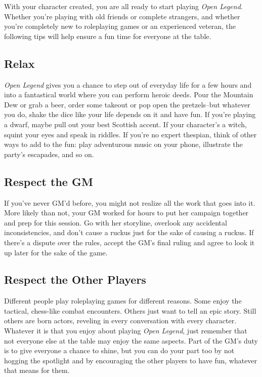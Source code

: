 \documentclass[12pt]{report}
\begin{document}
With your character created, you are all ready to start playing
\emph{Open Legend}. Whether you're playing with old friends or complete
strangers, and whether you're completely new to roleplaying games or an
experienced veteran, the following tips will help ensure a fun time for
everyone at the table.

\subsection{Relax}\label{relax}

\emph{Open Legend }gives you a chance to step out of everyday life for a
few hours and into a fantastical world where you can perform heroic
deeds. Pour the Mountain Dew or grab a beer, order some takeout or pop
open the pretzels--but whatever you do, shake the dice like your life
depends on it and have fun. If you're playing a dwarf, maybe pull out
your best Scottish accent. If your character's a witch, squint your eyes
and speak in riddles. If you're no expert thespian, think of other ways
to add to the fun: play adventurous music on your phone, illustrate the
party's escapades, and so on.

\subsection{Respect the GM}\label{respect-the-gm}

If you've never GM'd before, you might not realize all the work that
goes into it. More likely than not, your GM worked for hours to put her
campaign together and prep for this session. Go with her storyline,
overlook any accidental inconsistencies, and don't cause a ruckus just
for the sake of causing a ruckus. If there's a dispute over the rules,
accept the GM's final ruling and agree to look it up later for the sake
of the game.

\subsection{Respect the Other Players}\label{respect-the-other-players}

Different people play roleplaying games for different reasons. Some
enjoy the tactical, chess-like combat encounters. Others just want to
tell an epic story. Still others are born actors, reveling in every
conversation with every character. Whatever it is that you enjoy about
playing \emph{Open Legend}, just remember that not everyone else at the
table may enjoy the same aspects. Part of the GM's duty is to give
everyone a chance to shine, but you can do your part too by not hogging
the spotlight and by encouraging the other players to have fun, whatever
that means for them.
\end{document}
